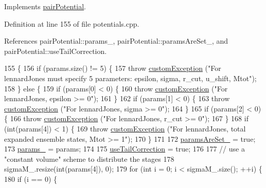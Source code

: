 Implements \hyperlink{classpair_potential_ad4b237646f9de2ae9f95cc9350564bc5}{pair\-Potential}.



Definition at line 155 of file potentials.\-cpp.



References pair\-Potential\-::params\-\_\-, pair\-Potential\-::params\-Are\-Set\-\_\-, and pair\-Potential\-::use\-Tail\-Correction.


\begin{DoxyCode}
155                                                                    \{
156     \textcolor{keywordflow}{if} (params.size() != 5) \{
157         \textcolor{keywordflow}{throw} \hyperlink{classcustom_exception}{customException} (\textcolor{stringliteral}{"For lennardJones must specify 5 parameters: epsilon, sigma,
       r\_cut, u\_shift, Mtot"});
158     \} \textcolor{keywordflow}{else} \{
159         \textcolor{keywordflow}{if} (params[0] < 0) \{
160             \textcolor{keywordflow}{throw} \hyperlink{classcustom_exception}{customException} (\textcolor{stringliteral}{"For lennardJones, epsilon >= 0"});
161         \}
162         \textcolor{keywordflow}{if} (params[1] < 0) \{
163             \textcolor{keywordflow}{throw} \hyperlink{classcustom_exception}{customException} (\textcolor{stringliteral}{"For lennardJones, sigma >= 0"});
164         \}
165         \textcolor{keywordflow}{if} (params[2] < 0) \{
166             \textcolor{keywordflow}{throw} \hyperlink{classcustom_exception}{customException} (\textcolor{stringliteral}{"For lennardJones, r\_cut >= 0"});
167         \}
168         \textcolor{keywordflow}{if} (\textcolor{keywordtype}{int}(params[4]) < 1) \{
169             \textcolor{keywordflow}{throw} \hyperlink{classcustom_exception}{customException} (\textcolor{stringliteral}{"For lennardJones, total expanded ensemble states, Mtot
       >= 1"});
170         \}
171 
172         \hyperlink{classpair_potential_a635755c0a952bfc05a4cfae230c3dbd2}{paramsAreSet\_} = \textcolor{keyword}{true};
173         \hyperlink{classpair_potential_abf8ec8af983d6e9960bd149da099e883}{params\_} = params;
174 
175         \hyperlink{classpair_potential_ab4b4538a7e13771f50a29aaac2443037}{useTailCorrection} = \textcolor{keyword}{true};
176 
177         \textcolor{comment}{// use a "constant volume" scheme to distribute the stages}
178         sigmaM\_.resize(\textcolor{keywordtype}{int}(params[4]), 0);
179         \textcolor{keywordflow}{for} (\textcolor{keywordtype}{int} i = 0; i < sigmaM\_.size(); ++i) \{
180             \textcolor{keywordflow}{if} (i == 0) \{

\end{DoxyCode}
